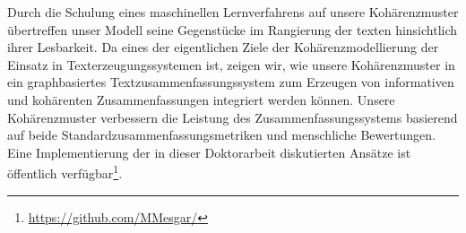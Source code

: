 Durch die Schulung eines maschinellen Lernverfahrens auf unsere Kohärenzmuster übertreffen unser Modell seine Gegenstücke im Rangierung der texten hinsichtlich ihrer Lesbarkeit. 
Da eines der eigentlichen Ziele der Kohärenzmodellierung der Einsatz in Texterzeugungssystemen ist, zeigen wir, wie unsere Kohärenzmuster in ein graphbasiertes Textzusammenfassungssystem zum Erzeugen von informativen und kohärenten Zusammenfassungen integriert werden können. 
Unsere Kohärenzmuster verbessern die Leistung des Zusammenfassungssystems basierend auf beide Standardzusammenfassungsmetriken und menschliche Bewertungen.
Eine Implementierung der in dieser Doktorarbeit diskutierten Ansätze ist öffentlich verfügbar\footnote{\url{https://github.com/MMesgar/}}. 